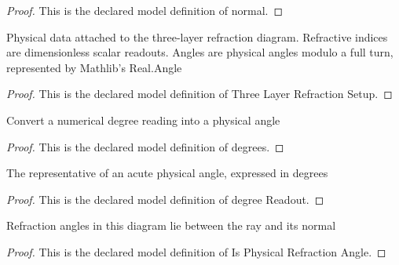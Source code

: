 \begin{proof}
  This is the declared model definition of normal.
\end{proof}
\begin{definition}
  \label{def:physics:phyx-mini-0000:phyxminiproblems-problemphyxmini0000-threelayerrefractionsetup}
  Physical data attached to the three-layer refraction diagram. Refractive indices are dimensionless scalar readouts. Angles are physical angles modulo a full turn, represented by Mathlib's Real.Angle
\end{definition}
\begin{proof}
  This is the declared model definition of Three Layer Refraction Setup.
\end{proof}
\begin{definition}[degrees]
  \label{def:physics:phyx-mini-0000:phyxminiproblems-problemphyxmini0000-degrees}
  Convert a numerical degree reading into a physical angle
\end{definition}
\begin{proof}
  This is the declared model definition of degrees.
\end{proof}
\begin{definition}
  \label{def:physics:phyx-mini-0000:phyxminiproblems-problemphyxmini0000-degreereadout}
  The representative of an acute physical angle, expressed in degrees
\end{definition}
\begin{proof}
  This is the declared model definition of degree Readout.
\end{proof}
\begin{definition}
  \label{def:physics:phyx-mini-0000:phyxminiproblems-problemphyxmini0000-isphysicalrefractionangle}
  Refraction angles in this diagram lie between the ray and its normal
\end{definition}
\begin{proof}
  This is the declared model definition of Is Physical Refraction Angle.
\end{proof}
